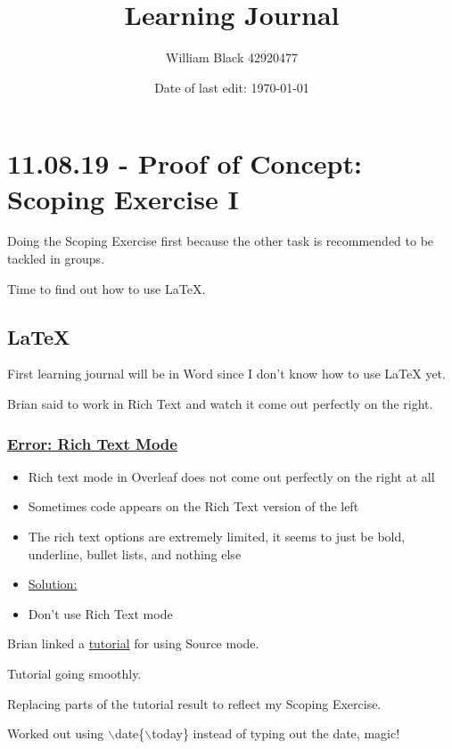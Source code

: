 \documentclass[12pt]{article}
\title{\textbf{Learning Journal}}
\date{Date of last edit: \today}
\author{William Black 42920477}
\begin{document}
\tableofcontents

\newpage\section{11.08.19 - Proof of Concept: Scoping Exercise I}

Doing the Scoping Exercise first because the other task is recommended to be tackled in groups.

Time to find out how to use LaTeX.

\subsection{LaTeX}

First learning journal will be in Word since I don’t know how to use LaTeX yet.

Brian said to work in Rich Text and watch it come out perfectly on the right.

\subsubsection{\underline{Error: Rich Text Mode}}\label{error:er1}
\begin{itemize}
    \item Rich text mode in Overleaf does not come out perfectly on the right at all
    \item Sometimes code appears on the Rich Text version of the left
    \item The rich text options are extremely limited, it seems to just be bold, underline, bullet lists, and nothing else
\end{itemize}
\begin{itemize}
\renewcommand{\labelitemi}{$\nobullet$}
\item \underline{Solution:}
\renewcommand{\labelitemi}{$\bullet$}
    \item Don’t use Rich Text mode
\end{itemize}

Brian linked a \href{https://www.overleaf.com/learn/latex/Creating_a_document_in_LaTeX}{tutorial} for using Source mode.

Tutorial going smoothly.

Replacing parts of the tutorial result to reflect my Scoping Exercise.

Worked out using $\backslash$date\{$\backslash$today\} instead of typing out the date, magic!
\end{document}
